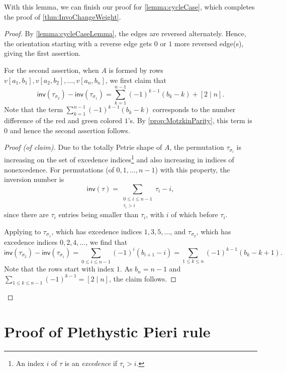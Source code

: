 \documentclass[pdflatex,sn-mathphys-num]{sn-jnl}%
\theoremstyle{thmstyleone}%
\theoremstyle{thmstyletwo}%
\theoremstyle{thmstylethree}%
\numberwithin{equation}{section}
\newcommand{\inv}{\mathsf{inv}}
\begin{document}
        With this lemma, we can finish our proof for \cref{lemma:cycleCase}, which completes the proof of \cref{thm:InvoChangeWeight}.
        \begin{proof}
            By \cref{lemma:cycleCaseLemma}, the edges are reversed alternately. Hence, the orientation starting with a reverse edge gets $0$ or $1$ more reversed edge(s), giving the first assertion.

            For the second assertion, when $A$ is formed by rows $v[a_1,b_1],v[a_2,b_2],\dotsc,v[a_n,b_n]$, we first claim that 
            \[\inv(\tau_{\sigma_2})-\inv(\tau_{\sigma_1}) = \sum_{k=1}^{n-1} (-1)^{k-1}(b_k-k)+[2\mid n].\] 
            Note that the term $\sum_{k=1}^{n-1} (-1)^{k-1}(b_k-k)$ corresponds to the number difference of the red and green colored $1$'s. By \cref{prop:MotzkinParity}, this term is $0$ and hence the second assertion follows.
            
            \begin{proof}[Proof (of claim)]
                Due to the totally Petrie shape of $A$, the permutation $\tau_{\sigma_i}$ is increasing on the set of excedence indices\footnote{An index $i$ of $\tau$ is an \emph{excedence} if $\tau_i>i$.} and also increasing in indices of nonexcedence. For permutations (of $0,1,\dotsc,n-1$) with this property, the inversion number is 
            \[\inv(\tau)=\sum_{\substack{0\leq i\leq n-1\\ \tau_i > i}} \tau_i-i, \]
            since there are $\tau_i$ entries being smaller than $\tau_i$, with $i$ of which before $\tau_i$.

            Applying to $\tau_{\sigma_1}$, which has excedence indices $1,3,5,\dotsc$, and $\tau_{\sigma_2}$, which has excedence indices $0,2,4,\dotsc$, we find that 
            \[\inv(\tau_{\sigma_2})-\inv(\tau_{\sigma_1}) = \sum_{0\leq i\leq n-1} (-1)^i (b_{i+1}-i) =\sum_{1\leq k\leq n}(-1)^{k-1}(b_k-k+1).\]
            Note that the rows start with index $1$. As $b_n=n-1$ and $\sum_{1\leq k\leq n-1}(-1)^{k-1} = [2\mid n]$, the claim follows.
                \let\qedsymbol\relax
            \end{proof}

        \end{proof}    

	\section{Proof of Plethystic Pieri rule}\label{sec:Plethysm}
        
\end{document}
